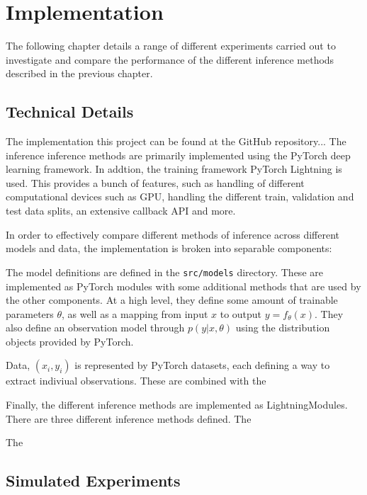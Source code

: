 \chapter{Implementation}

The following chapter details a range of different experiments carried out to investigate and compare the performance of the different inference methods described in the previous chapter. 


\section{Technical Details}

The implementation this project can be found at the GitHub repository... 
The inference inference methods are primarily implemented using the PyTorch deep learning framework. In addtion, the training framework PyTorch Lightning is used. This provides a bunch of features, such as handling of different computational devices such as GPU, handling the different train, validation and test data splits, an extensive callback API and more. 

In order to effectively compare different methods of inference across different models and data, the implementation is broken into separable components:

The model definitions are defined in the \texttt{src/models} directory. These are implemented as PyTorch modules with some additional methods that are used by the other components. 
At a high level, they define some amount of trainable parameters $\theta$, as well as a mapping from input $x$ to output $y=f_\theta(x)$. 
They also define an observation model through $p(y|x, \theta)$ using the distribution objects provided by PyTorch. 

Data, $(x_i, y_i)$ is represented by PyTorch datasets, each defining a way to extract indiviual observations. These are combined with the  

Finally, the different inference methods are implemented as LightningModules. There are three different inference methods defined. The 

The 



\section{Simulated Experiments}

